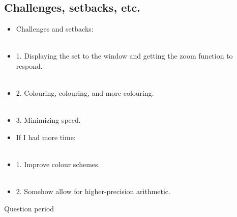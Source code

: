 \documentclass{beamer}
\begin{document}
\subsection{Challenges, setbacks, etc.}
\frame
{
\begin{itemize}
\item<1-> Challenges and setbacks:\\\text{}\\
\item<2-> 1. Displaying the set to the window and getting the zoom function to respond.\\\text{}\\
\item<3-> 2. Colouring, colouring, and more colouring.\\\text{}\\
\item<4-> 3. Minimizing speed.
\end{itemize}
}

\frame
{

\begin{itemize}
\item<1-> If I had more time:\\\text{}\\
\item<2-> 1. Improve colour schemes.\\\text{}\\
\item<3-> 2. Somehow allow for higher-precision arithmetic.
\end{itemize}
}

\frame
{
Question period
}
\end{document}
